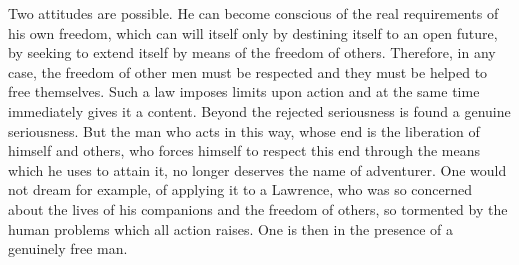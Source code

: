 \documentclass[11pt]{article}
\begin{document}
Two attitudes are possible. He can become conscious of the real requirements of his own freedom, which can will itself only by destining itself to an open future, by seeking to extend itself by means of the freedom of others. Therefore, in any case, the freedom of other men must be respected and they must be helped to free themselves. Such a law imposes limits upon action and at the same time immediately gives it a content. Beyond the rejected seriousness is found a genuine seriousness. But the man who acts in this way, whose end is the liberation of himself and others, who forces himself to respect this end through the means which he uses to attain it, no longer deserves the name of adventurer. One would not dream for example, of applying it to a Lawrence, who was so concerned about the lives of his companions and the freedom of others, so tormented by the human problems which all action raises. One is then in the presence of a genuinely free man.
\end{document}
